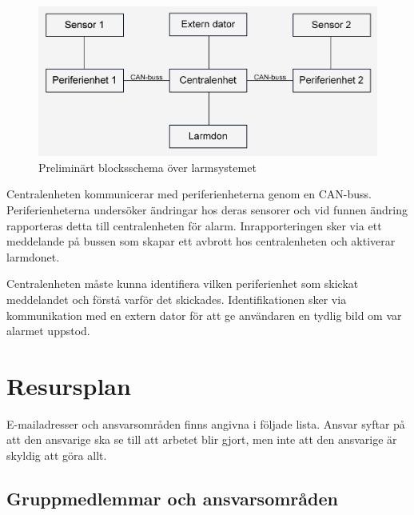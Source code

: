 \documentclass[a4paper]{article}
\begin{document}
\begin{figure}[H]
    \centering
    \includegraphics[width=\textwidth]{blockschema.png}
    \caption{Preliminärt blocksschema över larmsystemet}
\end{figure}

Centralenheten kommunicerar med periferienheterna genom en CAN-buss. Periferienheterna undersöker ändringar hos deras sensorer och vid funnen ändring rapporteras detta till centralenheten för alarm. Inrapporteringen sker via ett meddelande på bussen som skapar ett avbrott hos centralenheten och aktiverar larmdonet.

Centralenheten måste kunna identifiera vilken periferienhet som skickat meddelandet och förstå varför det skickades. Identifikationen sker via kommunikation med en extern dator för att ge användaren en tydlig bild om var alarmet uppstod.

\section{Resursplan}

E-mailadresser och ansvarsområden finns angivna i följade lista. Ansvar syftar på att den ansvarige ska se till att arbetet blir gjort, men inte att den ansvarige är skyldig att göra allt.

\subsection{Gruppmedlemmar och ansvarsområden}
\end{document}
